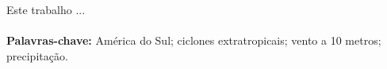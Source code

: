 
Este trabalho ...
\\
\\


\noindent \textbf{Palavras-chave:} América do Sul; ciclones extratropicais; vento a 10 metros; precipitação.